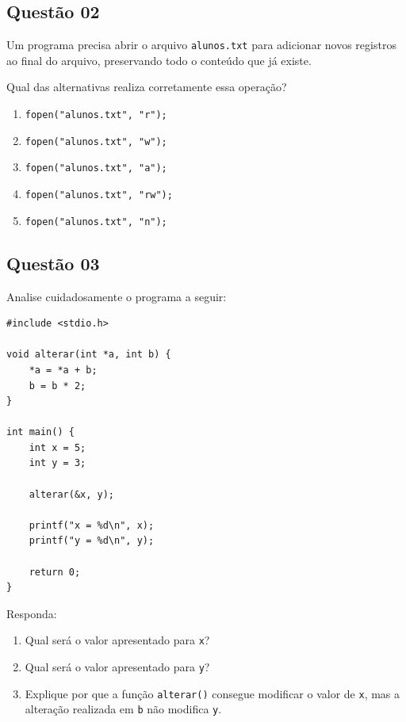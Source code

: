 \documentclass[12pt,a4paper]{article}
\begin{document}
\vspace{0.5cm}


\subsection*{Questão 02}

Um programa precisa abrir o arquivo \texttt{alunos.txt} para
adicionar novos registros ao final do arquivo, preservando todo
o conteúdo que já existe.

Qual das alternativas realiza corretamente essa operação?

\begin{enumerate}[label=\Alph*)]
    \item \texttt{fopen("alunos.txt", "r");}
    \item \texttt{fopen("alunos.txt", "w");}
    \item \texttt{fopen("alunos.txt", "a");}
    \item \texttt{fopen("alunos.txt", "rw");}
    \item \texttt{fopen("alunos.txt", "n");}
\end{enumerate}

\subsection*{Questão 03}

Analise cuidadosamente o programa a seguir:

\begin{lstlisting}
#include <stdio.h>

void alterar(int *a, int b) {
    *a = *a + b;
    b = b * 2;
}

int main() {
    int x = 5;
    int y = 3;

    alterar(&x, y);

    printf("x = %d\n", x);
    printf("y = %d\n", y);

    return 0;
}
\end{lstlisting}

Responda:

\begin{enumerate}[label=\alph*)]
    \item Qual será o valor apresentado para \texttt{x}?   
    \item Qual será o valor apresentado para \texttt{y}? 
    \item Explique por que a função \texttt{alterar()} consegue modificar
    o valor de \texttt{x}, mas a alteração realizada em \texttt{b} não
    modifica \texttt{y}.
\end{enumerate}
\end{document}
